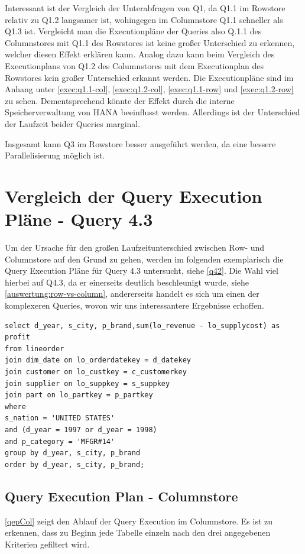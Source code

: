 Interessant ist der Vergleich der Unterabfragen von Q1, da Q1.1
im Rowstore relativ zu Q1.2 langsamer ist, wohingegen im Columnstore
Q1.1 schneller als Q1.3 ist.
Vergleicht man die Executionpläne der Queries also Q.1.1 des Columnstores mit Q1.1 des Rowstores ist keine großer Unterschied zu erkennen, welcher diesen Effekt
erklären kann.
Analog dazu kann beim Vergleich des Executionplans von Q1.2 des Columnstores
mit dem Executionplan des Rowstores kein großer Unterschied erkannt werden.
Die Executionpläne sind im Anhang unter \autoref{exec:q1.1-col},
\autoref{exec:q1.2-col}, \autoref{exec:q1.1-row} und \autoref{exec:q1.2-row}
zu sehen.
Dementsprechend könnte der Effekt durch die interne Speicherverwaltung von HANA
beeinflusst werden.
Allerdings ist der Unterschied der Laufzeit beider Queries marginal.

Insgesamt kann Q3 im Rowstore besser ausgeführt werden,
da eine bessere Parallelisierung möglich ist.

\section{Vergleich der Query Execution Pläne - Query 4.3}
Um der Ursache für den großen Laufzeitunterschied zwischen Row- und Columnstore auf den Grund zu gehen, werden im folgenden exemplarisch die Query Execution Pläne für Query 4.3 untersucht, siehe \autoref{q42}.
Die Wahl viel hierbei auf Q4.3, da er einerseits deutlich beschleunigt wurde, siehe \autoref{auswertung:row-vs-column}, andererseits handelt es sich um einen der komplexeren Queries, wovon wir uns interessantere Ergebnisse erhoffen.
\begin{lstlisting}[label=q42, caption={Benchmark Query 4.3}]
select d_year, s_city, p_brand,sum(lo_revenue - lo_supplycost) as profit
from lineorder
join dim_date on lo_orderdatekey = d_datekey
join customer on lo_custkey = c_customerkey
join supplier on lo_suppkey = s_suppkey
join part on lo_partkey = p_partkey
where
s_nation = 'UNITED STATES'
and (d_year = 1997 or d_year = 1998)
and p_category = 'MFGR#14'
group by d_year, s_city, p_brand
order by d_year, s_city, p_brand;
\end{lstlisting}

\subsection{Query Execution Plan - Columnstore}
\autoref{qepCol} zeigt den Ablauf der Query Execution im Columnstore. Es ist zu erkennen, dass zu Beginn jede Tabelle einzeln nach den drei angegebenen Kriterien gefiltert wird.

